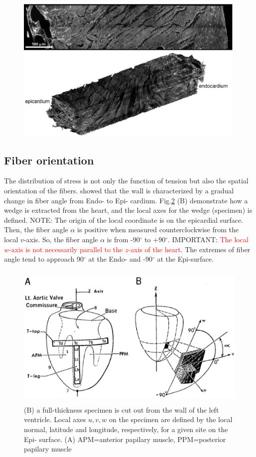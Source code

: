 \begin{figure}[hbt]
  \centerline{\includegraphics[height=7cm,
    angle=0]{./images/cardiac_slices.eps}}
  \caption{}
  \label{fig:cardiac_slices}
\end{figure}


\subsection{Fiber orientation}

The distribution of stress is not only the function of tension but also the
spatial orientation of the fibers. \citep{Streeter1969} showed that the wall is
characterized by a gradual change in fiber angle from Endo- to Epi- cardium.
Fig.\ref{fig:cut_fiber} (B) demonstrate how a wedge is extracted from the heart,
and the local axes for the wedge (specimen) is defined. NOTE: The origin of the
local coordinate is on the epicardial surface. Then, the fiber angle $\alpha$ is
positive when measured counterclockwise from the local $v$-axis. So, the fiber
angle $\alpha$ is from -90$^\circ$ to +90$^\circ$. IMPORTANT:
\textcolor{red}{The local $w$-axis is not necessarily parallel to the $z$-axis
of the heart}. The extremes of fiber angle tend to approach 90$^\circ$ at the
Endo- and -90$^\circ$ at the Epi-surface.

\begin{figure}[hbt]
  \centerline{\includegraphics[height=7cm,
    angle=0]{./images/cut_fiber.eps}}
  \caption{(B) a full-thickness specimen is cut out from the wall of the left
  ventricle. Local axes  $u,v,w$ on the specimen are defined by the local
  normal, latitude and longitude, respectively, for a given site on the Epi-
  surface. (A) APM=anterior papilary muscle, PPM=posterior papilary muscle
  \citep{Streeter1969}}
  \label{fig:cut_fiber}
\end{figure}

